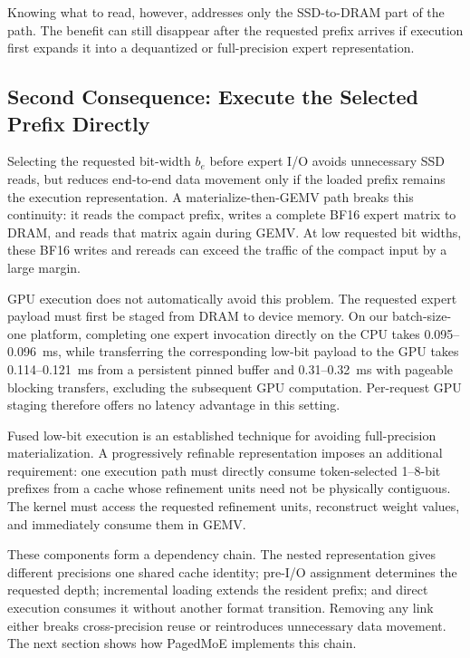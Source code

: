 \documentclass[sigconf, nonacm]{acmart}
\begin{document}
Knowing what to read, however, addresses only the SSD-to-DRAM part of
the path. The benefit can still disappear after the requested prefix
arrives if execution first expands it into a dequantized or
full-precision expert representation.

\subsection{Second Consequence:
Execute the Selected Prefix Directly}
\label{sec:challenge-compact-execution}

Selecting the requested bit-width \(b_e\) before expert I/O avoids
unnecessary SSD reads, but reduces end-to-end data movement only if
the loaded prefix remains the
execution representation. A materialize-then-GEMV path breaks this continuity: it reads the compact prefix, writes a complete
BF16 expert matrix to DRAM, and reads that matrix again during GEMV.
At low requested bit widths, these BF16 writes and rereads can exceed the traffic of the compact input by a large margin.

GPU execution does not automatically avoid this problem. The requested
expert payload must first be staged from DRAM to device memory. On our
batch-size-one platform, completing one expert invocation directly on
the CPU takes 0.095--0.096~ms, while transferring the corresponding
low-bit payload to the GPU takes 0.114--0.121~ms from a persistent
pinned buffer and 0.31--0.32~ms with pageable blocking transfers,
excluding the subsequent GPU computation. Per-request GPU staging
therefore offers no latency advantage in this setting.

Fused low-bit execution is an established technique for avoiding
full-precision materialization. A progressively refinable
representation imposes an additional requirement: one execution path
must directly consume token-selected 1--8-bit prefixes from a cache
whose refinement units need not be physically contiguous. The kernel
must access the requested refinement units, reconstruct weight values,
and immediately consume them in GEMV.

These components form a dependency chain. The nested representation
gives different precisions one shared cache identity; pre-I/O
assignment determines the requested depth; incremental loading extends
the resident prefix; and direct execution consumes it without another
format transition. Removing any link either breaks cross-precision
reuse or reintroduces unnecessary data movement. The next section
shows how PagedMoE implements this chain.
\end{document}
